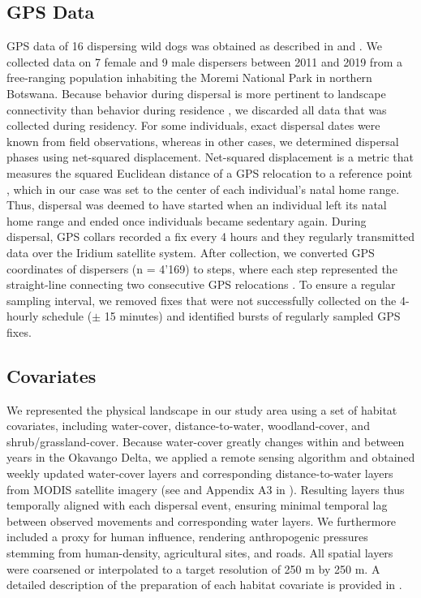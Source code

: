\documentclass[abstract=on,10pt,a4paper,bibliography=totocnumbered]{article}
\begin{document}
\subsection{GPS Data}
GPS data of 16 dispersing wild dogs was obtained as described in
\cite{Cozzi.2020} and \cite{Hofmann.2021}. We collected data on 7 female and 9
male dispersers between 2011 and 2019 from a free-ranging population inhabiting
the Moremi National Park in northern Botswana. Because behavior during dispersal
is more pertinent to landscape connectivity than behavior during residence
\citep{Elliot.2014, Abrahms.2017}, we discarded all data that was collected
during residency. For some individuals, exact dispersal dates were known from
field observations, whereas in other cases, we determined dispersal phases using
net-squared displacement. Net-squared displacement is a metric that measures the
squared Euclidean distance of a GPS relocation to a reference point
\citep{Borger.2012}, which in our case was set to the center of each
individual's natal home range. Thus, dispersal was deemed to have started when
an individual left its natal home range and ended once individuals became
sedentary again. During dispersal, GPS collars recorded a fix every 4 hours and
they regularly transmitted data over the Iridium satellite system. After
collection, we converted GPS coordinates of dispersers (n = 4'169) to steps,
where each step represented the straight-line connecting two consecutive GPS
relocations \citep{Turchin.1998}. To ensure a regular sampling interval, we
removed fixes that were not successfully collected on the 4-hourly schedule (\(
\pm \) 15 minutes) and identified bursts of regularly sampled GPS fixes.

\subsection{Covariates}
We represented the physical landscape in our study area using a set of habitat
covariates, including water-cover, distance-to-water, woodland-cover, and
shrub/grassland-cover. Because water-cover greatly changes within and between
years in the Okavango Delta, we applied a remote sensing algorithm and obtained
weekly updated water-cover layers and corresponding distance-to-water layers
from MODIS satellite imagery (see \citealp{Wolski.2017} and Appendix A3 in
\citealp{Hofmann.2021}). Resulting layers thus temporally aligned with each
dispersal event, ensuring minimal temporal lag between observed movements and
corresponding water layers. We furthermore included a proxy for human influence,
rendering anthropogenic pressures stemming from human-density, agricultural
sites, and roads. All spatial layers were coarsened or interpolated to a target
resolution of 250 m by 250 m. A detailed description of the preparation of each
habitat covariate is provided in \cite{Hofmann.2021}.
\end{document}
